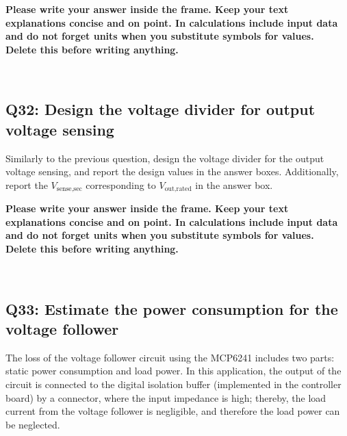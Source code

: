 \documentclass{PELsmallreport}
\begin{document}
\begin{framed}
	\vspace{2em}
	\textbf{Please write your answer inside the frame. Keep your text explanations concise and on point. In calculations include input data and do not forget units when you substitute symbols for values. \\ Delete this before writing anything.}
	\vspace{2em}
\end{framed}
 \quad {} \quad {} \quad {}\quad \\
 \quad  {} \quad  {} \quad\hfill{}

\subsection{Q32: Design the voltage divider for output voltage sensing}
Similarly to the previous question, design the voltage divider for the output voltage sensing, and report the design values in the answer boxes. Additionally, report the $V_\text{sense,sec}$ corresponding to $V_\text{out,rated}$ in the answer box. 
\begin{framed}
	\vspace{2em}
	\textbf{Please write your answer inside the frame. Keep your text explanations concise and on point. In calculations include input data and do not forget units when you substitute symbols for values. \\ Delete this before writing anything.}
	\vspace{2em}
\end{framed}
 \quad {} \quad {} \quad {}\quad \\
 \quad  {} \quad\hfill{}

\subsection{Q33: Estimate the power consumption for the voltage follower}
The loss of the voltage follower circuit using the MCP6241 includes two parts: static power consumption and load power. In this application, the output of the circuit is connected to the digital isolation buffer (implemented in the controller board) by a connector, where the input impedance is high; thereby, the load current from the voltage follower is negligible, and therefore the load power can be neglected.
\end{document}
